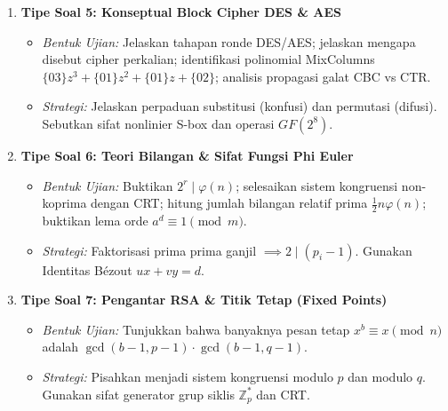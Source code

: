 \documentclass[11pt,a4paper]{article}
\begin{document}
\begin{enumerate}[leftmargin=*]
\begin{itemize}
        \item \textit{Strategi:} Mulai dari definisi jumlah logaritma peluang bersama $p(x, y) = p(y) p(x \mid y)$. Uraikan $\log(ab) = \log a + \log b$.
    \end{itemize}
    \item \textbf{Tipe Soal 5: Konseptual Block Cipher DES \& AES}
    \begin{itemize}
        \item \textit{Bentuk Ujian:} Jelaskan tahapan ronde DES/AES; jelaskan mengapa disebut cipher perkalian; identifikasi polinomial MixColumns $\{03\}z^3 + \{01\}z^2 + \{01\}z + \{02\}$; analisis propagasi galat CBC vs CTR.
        \item \textit{Strategi:} Jelaskan perpaduan substitusi (konfusi) dan permutasi (difusi). Sebutkan sifat nonlinier S-box dan operasi $GF(2^8)$.
    \end{itemize}
    \item \textbf{Tipe Soal 6: Teori Bilangan \& Sifat Fungsi Phi Euler}
    \begin{itemize}
        \item \textit{Bentuk Ujian:} Buktikan $2^r \mid \varphi(n)$; selesaikan sistem kongruensi non-koprima dengan CRT; hitung jumlah bilangan relatif prima $\frac{1}{2}n\varphi(n)$; buktikan lema orde $a^d \equiv 1 \pmod m$.
        \item \textit{Strategi:} Faktorisasi prima prima ganjil $\implies 2 \mid (p_i - 1)$. Gunakan Identitas B\'ezout $ux + vy = d$.
    \end{itemize}
    \item \textbf{Tipe Soal 7: Pengantar RSA \& Titik Tetap (Fixed Points)}
    \begin{itemize}
        \item \textit{Bentuk Ujian:} Tunjukkan bahwa banyaknya pesan tetap $x^b \equiv x \pmod n$ adalah $\gcd(b-1, p-1) \cdot \gcd(b-1, q-1)$.
        \item \textit{Strategi:} Pisahkan menjadi sistem kongruensi modulo $p$ dan modulo $q$. Gunakan sifat generator grup siklis $\mathbb{Z}_p^*$ dan CRT.
    \end{itemize}
\end{enumerate}
\end{document}
